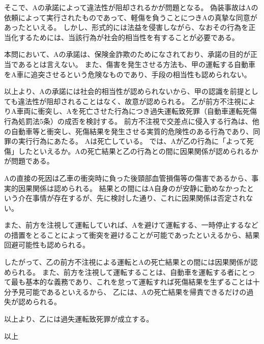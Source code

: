 \documentclass[11pt]{jsarticle}
\begin{document}
		そこで、Aの承諾によって違法性が阻却されるかが問題となる。
		偽装事故はAの依頼によって実行されたものであって、軽傷を負うことにつきAの真摯な同意があったといえる。
		しかし、形式的には法益を侵害しながら、なおその行為を正当化するためには、当該行為が社会的相当性を有することが必要である。
		
		本問において、Aの承諾は、保険金詐欺のためになされており、承諾の目的が正当であるとは言えない。
		また、傷害を発生させる方法も、甲の運転する自動車をA車に追突させるという危険なものであり、手段の相当性も認められない。
		
		以上より、Aの承諾には社会的相当性が認められないから、甲の認識を前提としても違法性が阻却されることはなく、故意が認められる。
\sectionA{}
	乙が前方不注視によりA車両に衝突し、Aを死亡させた行為につき過失運転致死罪（自動車運転死傷行為処罰法5条）の成否を検討する。
	\sectionB{}
		前方不注視で交差点に侵入する行為は、他の自動車等と衝突し、死傷結果を発生させる実質的危険性のある行為であり、同罪の実行行為にあたる。
		Aは死亡している。
	\sectionB{}
		では、Aが乙の行為に「よって死傷」したといえるか。Aの死亡結果と乙の行為との間に因果関係が認められるかが問題である。
		
		Aの直接の死因は乙車の衝突時に負った後頸部血管損傷等の傷害であるから、事実的因果関係は認められる。
		結果との間にはA自身のが安静に勤めなかったという介在事情が存在するが、先に検討した通り、これに因果関係は否定されない。
		
		また、前方を注視して運転していれば、Aを避けて運転する、一時停止するなどの措置をとることによって衝突を避けることが可能であったといえるから、結果回避可能性も認められる。
		
		したがって、乙の前方不注視による運転とAの死亡結果との間には因果関係が認められる。
	\sectionB{}
		また、前方を注視して運転することは、自動車を運転する者にとって最も基本的な義務であり、これを怠って運転すれば死傷結果を生ずることは十分予見可能であるといえるから、
		乙には、Aの死亡結果を帰責できるだけの過失が認められる。
		
		以上より、乙には過失運転致死罪が成立する。


\begin{flushright}
	以上
\end{flushright}
	
\end{document}
